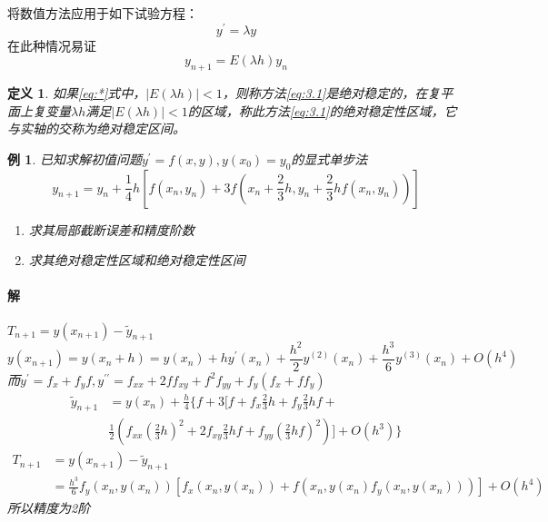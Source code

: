 \documentclass{article}
\newtheorem{definition}{定义}[section]
\newtheorem{example}{例}
\begin{document}
将数值方法应用于如下试验方程：
$$y^{'}=\lambda y $$
在此种情况易证
\begin{equation}
    y_{n+1}=E(\lambda h)y_n 
    \label{eq:*}
\end{equation}

\begin{definition}
    如果\ref{eq:*}式中，$|E(\lambda h)|<1$，则称方法\ref{eq:3.1}是绝对稳定的，在复平面上复变量$\lambda h$满足$|E(\lambda h)|<1$的区域，称此方法\ref{eq:3.1}的绝对稳定性区域，它与实轴的交称为绝对稳定区间。
\end{definition}

\begin{example}
    已知求解初值问题$y^{'}=f(x,y), y(x_0)=y_0$的显式单步法
    $$y_{n+1}=y_n+\frac{1}{4}h[f(x_n,y_n)+3f(x_n+\frac{2}{3}h,y_n+\frac{2}{3}hf(x_n,y_n))] $$
    \begin{enumerate}
        \item 求其局部截断误差和精度阶数
        \item 求其绝对稳定性区域和绝对稳定性区间
    \end{enumerate}

    \paragraph{解}$T_{n+1}=y(x_{n+1})-\widetilde{y}_{n+1} $
    $$y(x_{n+1})=y(x_n+h)=y(x_n)+hy^{'}(x_n)+\frac{h^2}{2}y^{(2)}(x_n)+\frac{h^3}{6}y^{(3)}(x_n)+O(h^4) $$
    而$y^{'}=f_x+f_yf, y^{{'}{'}}=f_{xx}+2ff_{xy}+f^2f_{yy}+f_y(f_x+ff_y) $\\
    \begin{equation*}
        \begin{split}
            \widetilde{y}_{n+1}&=y(x_n) + \frac{h}{4}\{f+3[f+f_x\frac{2}{3}h+f_y\frac{2}{3}hf+\\
            &\frac{1}{2}(f_{xx}(\frac{2}{3}h)^2+2f_{xy}\frac{2}{3}hf+f_{yy}(\frac{2}{3}hf)^2)]+O(h^3) \}
        \end{split}
    \end{equation*}
    \begin{equation*}
        \begin{split}
            T_{n+1} &= y(x_{n+1})-\widetilde{y}_{n+1}\\
            &=\frac{h^3}{6}f_y(x_n, y(x_n))[f_x(x_n,y(x_n))+f(x_n,y(x_n)f_y(x_n,y(x_n)))]+O(h^4)
        \end{split}
    \end{equation*}
    所以精度为2阶


\end{example}
\end{document}
